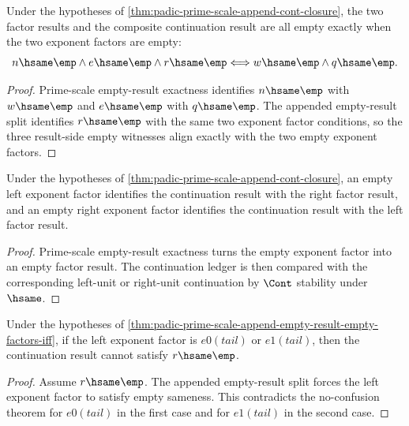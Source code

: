 \begin{theorem}
\label{thm:padic-prime-scale-append-factor-empty-alignment-iff}
Under the hypotheses of
\autoref{thm:padic-prime-scale-append-cont-closure}, the two factor results
and the composite continuation result are all empty exactly when the two
exponent factors are empty:
$$
n\hsame\emp\land e\hsame\emp\land r\hsame\emp
\Longleftrightarrow
w\hsame\emp\land q\hsame\emp.
$$
\end{theorem}
\begin{proof}
Prime-scale empty-result exactness identifies \(n\hsame\emp\) with
\(w\hsame\emp\) and \(e\hsame\emp\) with \(q\hsame\emp\). The appended
empty-result split identifies \(r\hsame\emp\) with the same two exponent
factor conditions, so the three result-side empty witnesses align exactly
with the two empty exponent factors.
\end{proof}

\begin{theorem}
\label{thm:padic-prime-scale-append-empty-factor-result-hsame}
Under the hypotheses of
\autoref{thm:padic-prime-scale-append-cont-closure}, an empty left exponent
factor identifies the continuation result with the right factor result, and an
empty right exponent factor identifies the continuation result with the left
factor result.
\end{theorem}
\begin{proof}
Prime-scale empty-result exactness turns the empty exponent factor into an
empty factor result. The continuation ledger is then compared with the
corresponding left-unit or right-unit continuation by $\Cont$ stability under
$\hsame$.
\end{proof}

\begin{theorem}
\label{thm:padic-prime-scale-append-visible-exponent-result-nonempty}
Under the hypotheses of
\autoref{thm:padic-prime-scale-append-empty-result-empty-factors-iff}, if the
left exponent factor is $e0(tail)$ or $e1(tail)$, then the continuation result
cannot satisfy $r\hsame\emp$.
\end{theorem}
\begin{proof}
Assume $r\hsame\emp$. The appended empty-result split forces the left exponent
factor to satisfy empty sameness. This contradicts the no-confusion theorem for
$e0(tail)$ in the first case and for $e1(tail)$ in the second case.
\end{proof}

